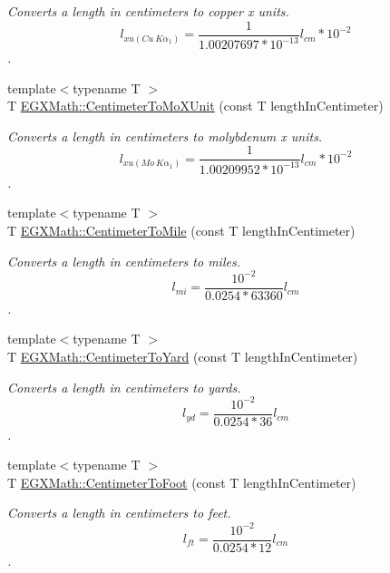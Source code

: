 \begin{DoxyCompactItemize}
\begin{DoxyCompactList}\small\item\em Converts a length in centimeters to copper x units. \[ l_{xu(Cu\ K\alpha_1)}= \frac{1}{1.00207697*10^{-13}} l_{cm} * 10^{-2}\]. \end{DoxyCompactList}\item 
{\footnotesize template$<$typename T $>$ }\\T \mbox{\hyperlink{group___e_g_x_math-_conversions-_length_conversions-_s_i-_centimeter-_non-_s_i_ga4e94aa6f1cc6aaeb751384a8472b01fd}{E\+G\+X\+Math\+::\+Centimeter\+To\+Mo\+X\+Unit}} (const T length\+In\+Centimeter)
\begin{DoxyCompactList}\small\item\em Converts a length in centimeters to molybdenum x units. \[ l_{xu(Mo\ K\alpha_1)}=\frac{1}{1.00209952*10^{-13}} l_{cm} * 10^{-2}\]. \end{DoxyCompactList}\item 
{\footnotesize template$<$typename T $>$ }\\T \mbox{\hyperlink{group___e_g_x_math-_conversions-_length_conversions-_s_i-_centimeter-_imperial_gacba2e8c1f187fae381009e4413d5d4fb}{E\+G\+X\+Math\+::\+Centimeter\+To\+Mile}} (const T length\+In\+Centimeter)
\begin{DoxyCompactList}\small\item\em Converts a length in centimeters to miles. \[ l_{mi}=\frac{10^{-2}}{0.0254 * 63360} l_{cm} \]. \end{DoxyCompactList}\item 
{\footnotesize template$<$typename T $>$ }\\T \mbox{\hyperlink{group___e_g_x_math-_conversions-_length_conversions-_s_i-_centimeter-_imperial_ga9b25beac97b6dfc0700508ca60760dfe}{E\+G\+X\+Math\+::\+Centimeter\+To\+Yard}} (const T length\+In\+Centimeter)
\begin{DoxyCompactList}\small\item\em Converts a length in centimeters to yards. \[ l_{yd}= \frac{10^{-2}}{0.0254 * 36} l_{cm} \]. \end{DoxyCompactList}\item 
{\footnotesize template$<$typename T $>$ }\\T \mbox{\hyperlink{group___e_g_x_math-_conversions-_length_conversions-_s_i-_centimeter-_imperial_ga27bbb3b1cf61bac428f40d6804e9aaec}{E\+G\+X\+Math\+::\+Centimeter\+To\+Foot}} (const T length\+In\+Centimeter)
\begin{DoxyCompactList}\small\item\em Converts a length in centimeters to feet. \[ l_{ft}= \frac{10^{-2}}{0.0254 * 12} l_{cm} \]. \end{DoxyCompactList}\item 

\end{DoxyCompactItemize}
